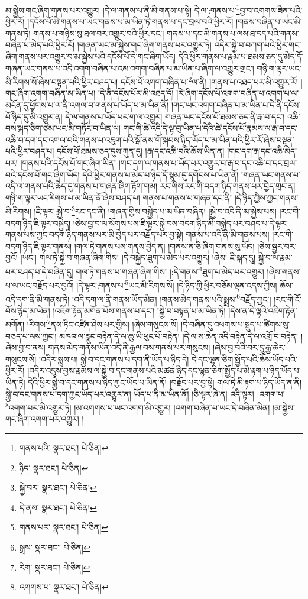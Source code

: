 མ་སྐྱེས་གང་ཞིག་གནས་པར་འགྱུར། །དེ་ལ་གནས་པ་ནི་མི་གནས་པ་སྟེ། དེ་ལ་:གནས་པ་\footnote{གནས་པའི་  སྣར་ཐང་།  པེ་ཅིན། }བྱ་བ་འགགས་ཟིན་པའི་ཕྱིར་རོ། །དངོས་པོ་མི་གནས་པ་ཡང་གནས་པ་མ་ཡིན་ཏེ་གནས་པ་དང་བྲལ་བའི་ཕྱིར་རོ། །གནས་བཞིན་པ་ཡང་མི་གནས་ཏེ། གནས་པ་གཉིས་སུ་ཐལ་བར་འགྱུར་བའི་ཕྱིར་དང་། གནས་པ་དང་མི་གནས་པ་ལས་ཐ་དད་པའི་གནས་བཞིན་པ་མེད་པའི་ཕྱིར་རོ། །གཞན་ཡང་མ་སྐྱེས་གང་ཞིག་གནས་པར་འགྱུར་ཏེ། འདིར་སྐྱེ་བ་བཀག་པའི་ཕྱིར་གང་ཞིག་གནས་པར་འགྱུར་བ་མ་སྐྱེས་པའི་དངོས་པོ་དེ་གང་ཞིག་ཡོད། དེའི་ཕྱིར་གནས་པ་རྣམ་པ་ཐམས་ཅད་དུ་མེད་དོ་གཞན་ཡང་གནས་པ་འདི་འགག་བཞིན་པ་འམ་འགག་བཞིན་པ་མ་ཡིན་པ་ཞིག་ལ་འགྱུར་གྲང་། གཉི་ག་ལྟར་ཡང་མི་རིགས་སོ་ཞེས་བསྟན་པའི་ཕྱིར་བཤད་པ། དངོས་པོ་འགག་བཞིན་པ་\footnote{ཉིད་  སྣར་ཐང་།  པེ་ཅིན། }ལ་ནི། །གནས་པ་འཐད་པར་མི་འགྱུར་རོ། །གང་ཞིག་འགག་བཞིན་མ་ཡིན་པ། །དེ་ནི་དངོས་པོར་མི་འཐད་དོ། །རེ་ཞིག་དངོས་པོ་འགག་བཞིན་པ་འགག་པ་ལ་མངོན་དུ་ཕྱོགས་པ་ལ་ནི་འགལ་བ་གནས་པ་ཡོད་པ་མ་ཡིན་ནོ། །གང་ཡང་འགག་བཞིན་པ་མ་ཡིན་པ་དེ་ནི་དངོས་པོ་ཉིད་དུ་མི་འགྱུར་ན། དེ་ལ་གནས་པ་ཡོད་པར་ག་ལ་འགྱུར། གཞན་ཡང་དངོས་པོ་ཐམས་ཅད་ནི་རྒ་བ་དང་། འཆི་བས་སྐད་ཅིག་ཙམ་ཡང་མི་གཏོང་བ་ཡིན་ལ། གང་གི་ཚེ་འདི་དེ་ལྟ་བུ་ཡིན་པ་དེའི་ཚེ་དངོས་པོ་རྣམས་ལ་རྒ་བ་དང་འཆི་བ་དག་དང་འགལ་བའི་གནས་པ་འཇུག་པའི་སྒོ་ནས་གོ་སྐབས་ཉིད་ཡོད་པ་མ་ཡིན་པའི་ཕྱིར་རོ་ཞེས་བསྟན་པའི་ཕྱིར་བཤད་པ། དངོས་པོ་ཐམས་ཅད་དུས་ཀུན་དུ། །རྒ་དང་འཆི་བའི་ཆོས་ཡིན་ན། །གང་དག་རྒ་དང་འཆི་མེད་པར། །གནས་པའི་དངོས་པོ་གང་ཞིག་ཡིན། །གང་དག་ལ་གནས་པ་ཡོད་པར་འགྱུར་བ་རྒ་བ་དང་འཆི་བ་དང་བྲལ་བའི་དངོས་པོ་གང་ཞིག་ཡོད། དེའི་ཕྱིར་གནས་པ་མེད་པ་ཉིད་དོ་སྙམ་དུ་དགོངས་པ་ཡིན་ནོ། །གཞན་ཡང་གནས་པ་འདི་ལ་གནས་པའི་ཆེད་དུ་གནས་པ་གཞན་ཞིག་རྟོག་གམ། རང་གིས་རང་གི་བདག་ཉིད་གནས་པར་བྱེད་གྲང་ན། གཉི་ག་ལྟར་ཡང་རིགས་པ་མ་ཡིན་ནོ་ཞེས་བཤད་པ། གནས་པ་གནས་པ་གཞན་དང་ནི། །དེ་ཉིད་ཀྱིས་ཀྱང་གནས་མི་རིགས། །ཇི་ལྟར་:སྐྱེ་བ་\footnote{སྐྱེ་བར་  སྣར་ཐང་།  པེ་ཅིན། }རང་དང་ནི། །གཞན་གྱིས་བསྐྱེད་པ་མ་ཡིན་བཞིན། །སྐྱེ་བ་འདི་ནི་མ་སྐྱེས་པས། །རང་གི་བདག་ཉིད་ཇི་ལྟར་བསྐྱེད། །ཅེས་བྱ་བ་ལ་སོགས་པས་ཇི་ལྟར་སྐྱེ་བས་བདག་ཉིད་མི་བསྐྱེད་པར་བཤད་པ་དེ་ལྟར། གནས་པས་ཀྱང་བདག་ཉིད་གནས་པར་མི་བྱེད་པར་བརྗོད་པར་བྱ་སྟེ། གནས་པ་འདི་ནི་མི་གནས་པས། །རང་གི་བདག་ཉིད་ཇི་ལྟར་གནས། །གལ་ཏེ་གནས་པས་གནས་བྱེད་ན། །གནས་ན་ཅི་ཞིག་གནས་སུ་ཡོད། །ཅེས་སྦྱར་བར་བྱའོ། །ཡང་། གལ་ཏེ་སྐྱེ་བ་གཞན་ཞིག་གིས། །དེ་བསྐྱེད་ཐུག་པ་མེད་པར་འགྱུར། །ཞེས། ཇི་སྐད་དུ། སྐྱེ་བ་ལ་རྣམ་པར་བཤད་པ་དེ་བཞིན་དུ། གལ་ཏེ་གནས་པ་གཞན་ཞིག་གིས། །:དེ་གནས་\footnote{དེ་ནས་  སྣར་ཐང་།  པེ་ཅིན། }ཐུག་པ་མེད་པར་འགྱུར། །ཞེས་གནས་པ་ལ་ཡང་བརྗོད་པར་བྱའོ། །དེ་ལྟར་:གནས་པ་\footnote{གནས་པར་  སྣར་ཐང་།  པེ་ཅིན། }ཡང་མི་རིགས་སོ། །དེ་ཉིད་ཀྱི་ཕྱིར་བཅོམ་ལྡན་འདས་ཀྱིས། ཆོས་འདི་དག་ནི་མི་གནས་ཏེ། །འདི་དག་ལ་ནི་གནས་ཡོད་མིན། །གནས་མེད་གནས་པའི་སྨྲས་\footnote{སྒྲས་  སྣར་ཐང་།  པེ་ཅིན། }བརྗོད་ཀྱང་། །རང་གི་ངོ་བོས་རྙེད་མ་ཡིན། །འཇིག་རྟེན་མགོན་པོས་གནས་པ་དང་། །སྐྱེ་བ་བསྟན་པ་མ་ཡིན་ཏེ། །དེས་ན་དེ་ལྟའི་འཇིག་རྟེན་མགོན། །རིགས་\footnote{རིག་  སྣར་ཐང་།  པེ་ཅིན། }ནས་ཏིང་འཛིན་ཤེས་པར་གྱིས། །ཞེས་གསུངས་སོ། །དེ་བཞིན་དུ་འཕགས་པ་སྡུད་པ་ཚིགས་སུ་བཅད་པ་ལས་ཀྱང་། མཁའ་ལ་རླུང་བརྟེན་དེ་ལ་ཆུ་ཡི་ཕུང་པོ་བརྟེན། །དེ་ལ་ས་ཆེན་འདི་བརྟེན་དེ་ལ་འགྲོ་བ་བརྟེན། །ཞེས་བྱ་བ་ནས། གནས་མེད་གནས་ཡིན་འདི་ནི་རྒྱལ་བས་གནས་པར་གསུངས། །ཞེས་བྱ་བའི་བར་དུ་རྒྱ་ཆེར་གསུངས་སོ། །འདིར་སྨྲས་པ། སྐྱེ་བ་དང་གནས་པ་དག་ནི་ཡོད་པ་ཉིད་དེ། དེ་དང་ལྷན་ཅིག་སྤྱོད་པའི་ཆོས་ཡོད་པའི་ཕྱིར་རོ། །འདིར་འདུས་བྱས་རྣམས་ལ་སྐྱེ་བ་དང་གནས་པའི་མཚན་ཉིད་དང་ལྷན་ཅིག་སྤྱོད་པ་མི་རྟག་པ་ཉིད་ཡོད་པ་ཡིན་ཏེ། དེའི་ཕྱིར་སྐྱེ་བ་དང་གནས་པ་ཉིད་ཀྱང་ཡོད་པ་ཡིན་ནོ། །བརྗོད་པར་བྱ་སྟེ། གལ་ཏེ་མི་རྟག་པ་ཉིད་ཡོད་ན་ནི། སྐྱེ་བ་དང་གནས་པ་དག་ཀྱང་ཡོད་པར་འགྱུར་ན། ཡོད་པ་ནི་མ་ཡིན་ནོ། །ཅི་ལྟར་ཞེ་ན། འདི་ལྟར། :འགག་པ་\footnote{འགགས་པ་  སྣར་ཐང་།  པེ་ཅིན། }འགག་པར་མི་འགྱུར་ཏེ། །མ་འགགས་པ་ཡང་འགག་མི་འགྱུར། །འགག་བཞིན་པ་ཡང་དེ་བཞིན་མིན། །མ་སྐྱེས་གང་ཞིག་འགག་པར་འགྱུར། །
